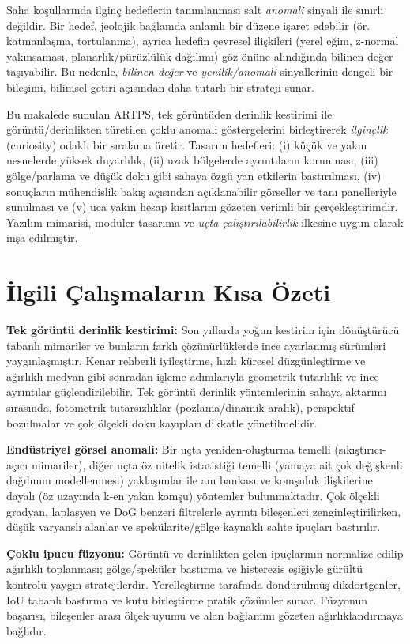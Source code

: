 \documentclass[12pt]{article}
\begin{document}
Saha koşullarında ilginç hedeflerin tanımlanması salt \emph{anomali} sinyali ile sınırlı değildir. Bir hedef, jeolojik bağlamda anlamlı bir düzene işaret edebilir (ör. katmanlaşma, tortulanma), ayrıca hedefin çevresel ilişkileri (yerel eğim, z-normal yakınsaması, planarlık/pürüzlülük dağılımı) göz önüne alındığında bilinen değer taşıyabilir. Bu nedenle, \emph{bilinen değer} ve \emph{yenilik/anomali} sinyallerinin dengeli bir bileşimi, bilimsel getiri açısından daha tutarlı bir strateji sunar.

Bu makalede sunulan ARTPS, tek görüntüden derinlik kestirimi ile görüntü/derinlikten türetilen çoklu anomali göstergelerini birleştirerek \emph{ilginçlik} (curiosity) odaklı bir sıralama üretir. Tasarım hedefleri: (i) küçük ve yakın nesnelerde yüksek duyarlılık, (ii) uzak bölgelerde ayrıntıların korunması, (iii) gölge/parlama ve düşük doku gibi sahaya özgü yan etkilerin bastırılması, (iv) sonuçların mühendislik bakış açısından açıklanabilir görseller ve tanı panelleriyle sunulması ve (v) uca yakın hesap kısıtlarını gözeten verimli bir gerçekleştirimdir. Yazılım mimarisi, modüler tasarıma ve \emph{uçta çalıştırılabilirlik} ilkesine uygun olarak inşa edilmiştir.

\section{İlgili Çalışmaların Kısa Özeti}
\textbf{Tek görüntü derinlik kestirimi:} Son yıllarda yoğun kestirim için dönüştürücü tabanlı mimariler ve bunların farklı çözünürlüklerde ince ayarlanmış sürümleri yaygınlaşmıştır. Kenar rehberli iyileştirme, hızlı küresel düzgünleştirme ve ağırlıklı medyan gibi sonradan işleme adımlarıyla geometrik tutarlılık ve ince ayrıntılar güçlendirilebilir. Tek görüntü derinlik yöntemlerinin sahaya aktarımı sırasında, fotometrik tutarsızlıklar (pozlama/dinamik aralık), perspektif bozulmalar ve çok ölçekli doku kayıpları dikkatle yönetilmelidir.

\textbf{Endüstriyel görsel anomali:} Bir uçta yeniden-oluşturma temelli (sıkıştırıcı-açıcı mimariler), diğer uçta öz nitelik istatistiği temelli (yamaya ait çok değişkenli dağılımın modellenmesi) yaklaşımlar ile anı bankası ve komşuluk ilişkilerine dayalı (öz uzayında k-en yakın komşu) yöntemler bulunmaktadır. Çok ölçekli gradyan, laplasyen ve DoG benzeri filtrelerle ayrıntı bileşenleri zenginleştirilirken, düşük varyanslı alanlar ve spekülarite/gölge kaynaklı sahte ipuçları bastırılır.

\textbf{Çoklu ipucu füzyonu:} Görüntü ve derinlikten gelen ipuçlarının normalize edilip ağırlıklı toplanması; gölge/speküler bastırma ve histerezis eşiğiyle gürültü kontrolü yaygın stratejilerdir. Yerelleştirme tarafında döndürülmüş dikdörtgenler, IoU tabanlı bastırma ve kutu birleştirme pratik çözümler sunar. Füzyonun başarısı, bileşenler arası ölçek uyumu ve alan bağlamını gözeten ağırlıklandırmaya bağlıdır.
\end{document}
